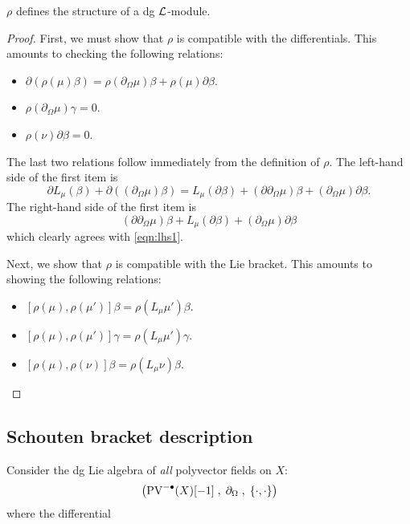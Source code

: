 \documentclass[11pt]{amsart}
\def\PV{{\rm PV}}
\begin{document}
\begin{lem}
$\rho$ defines the structure of a dg $\mathcal L$-module.
\end{lem}
\begin{proof}
First, we must show that $\rho$ is compatible with the differentials.
This amounts to checking the following relations:
\begin{itemize}
\item $\partial (\rho(\mu) \beta) = \rho(\partial_\Omega \mu) \beta + \rho(\mu) \partial \beta$.
\item $\rho(\partial_\Omega \mu) \gamma = 0$. 
\item $\rho (\nu) \partial \beta = 0$. 
\end{itemize}
The last two relations follow immediately from the definition of $\rho$.
The left-hand side of the first item is
\begin{equation}\label{eqn:lhs1}
\partial L_\mu( \beta) + \partial ((\partial_\Omega \mu) \beta) =  L_\mu( \partial \beta) + (\partial \partial_\Omega \mu) \beta + (\partial_\Omega \mu) \partial \beta .
\end{equation}
The right-hand side of the first item is
\begin{equation}\label{eqn:rhs1}
(\partial \partial_\Omega \mu) \beta + L_\mu (\partial \beta) + (\partial_\Omega \mu) \partial \beta 
\end{equation}
which clearly agrees with \eqref{eqn:lhs1}. 

Next, we show that $\rho$ is compatible with the Lie bracket. 
This amounts to showing the following relations:
\begin{itemize}
\item $[\rho(\mu), \rho(\mu')] \beta = \rho(L_\mu \mu')\beta$.
\item $[\rho(\mu), \rho(\mu')] \gamma = \rho(L_\mu \mu')\gamma$.
\item $[\rho(\mu),\rho(\nu)] \beta = \rho(L_\mu \nu) \beta$. 
\end{itemize}
\end{proof}

\subsection{Schouten bracket description}

Consider the dg Lie algebra of {\em all} polyvector fields on $X$:
\[
\left(\PV^{-\bu} (X) [-1] \; , \; \partial_\Omega \; , \; \{\cdot, \cdot\} \right)
\]
where the differential 
\end{document}
